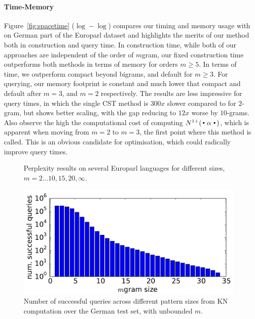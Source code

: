 \paragraph{Time-Memory}
Figure~\ref{fig:spacetime} ($\log-\log$) compares our timing and memory usage with \SRILM on German part of the Europarl dataset and highlights the merits of our method both in construction and query time. In construction time, while both of our approaches are independent of the order of $m$gram, our fixed construction time outperforms both \SRILM methods in terms of memory for orders $m \ge 5$. 
In terms of time, we outperform \SRILM compact beyond bigrams, and \SRILM default for $m \ge 3$. 
For querying, our memory footprint is constant and much lower that \SRILM compact and \SRILM default after $m=3$, and $m=2$ respectively. 
The results are less impressive for query times, in which the single CST method is $300x$ slower compared to \SRILM for $2$-gram, but shows better scaling, with the gap reducing to $12x$ worse by $10$-grams.  
Also observe the high the computational cost of computing $\nlplus{\Bigcdot \alpha \Bigcdot}$, which is apparent when moving from $m=2$ to $m=3$, the first point where this method is called. 
This is an obvious candidate for optimisation, which could radically improve query times.

\begin{figure}[tb]

\caption{Perplexity results on several Europarl languages for different \ngram sizes, $m=2\ldots10,15,20,\infty$.}
\label{fig:pplx}
\end{figure}

\begin{figure}[tb]
\includegraphics[width=\columnwidth]{figures/german_pattern_size.pdf}
\caption{Number of successful queries across different pattern sizes from KN computation over the German test set, with unbounded $m$.}
\label{fig:germanpattern}
\end{figure}


